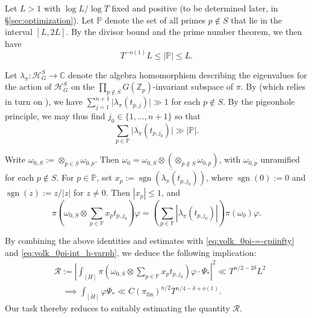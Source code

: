 \documentclass[reqno]{amsart}
\DeclareMathOperator{\sgn}{sgn}
\DeclareMathOperator{\fin}{fin}
\theoremstyle{plain} \newtheorem{theorem} {Theorem}
\theoremstyle{definition} \newtheorem{definition} [theorem] {Definition}
\theoremstyle{itplain} %
\numberwithin{equation}{section}
\numberwithin{theorem}{section}
\renewcommand{\leq}{\leqslant}
\begin{document}
Let $L > 1$ with $\log L / \log T$ fixed and positive (to be determined later, in \S\ref{sec:optimization}).  Let $\mathbb{P}$ denote the set of all primes $p \notin S$ that lie in the interval $[L,2 L]$.  By the divisor bound and the prime number theorem, we then have
\begin{equation*}
T^{-o(1)} L \leq |\mathbb{P}| \leq L.
\end{equation*}


Let $\lambda_\pi : \mathcal{H}_G^S \rightarrow \mathbb{C}$ denote the algebra homomorphism  describing the eigenvalues for the action of $\mathcal{H}_G^S$ on the $\prod_{p \notin S} G(\mathbb{Z}_p)$-invariant subspace of $\pi$.  By \cite[(5.6)]{2020arXiv201202187N} (which relies in turn on \cite[Cor 4.3]{2014arXiv1405.6691B}), we have $\sum_{j=1}^{n+1} \lvert \lambda_{\pi}(t_{p,j}) \rvert \gg 1$ for each $p \notin S$.  By the pigeonhole principle, we may thus find $j_0 \in \{1, \dotsc, n+1\}$ so that
\begin{equation*}
\sum_{p \in \mathbb{P}} \lvert \lambda_{\pi}(t_{p,j_0}) \rvert \gg |\mathbb{P}|.
\end{equation*}

Write $\omega_{0,S} := \otimes_{p \in S} \omega_{0,p}$.  Then $\omega_0 = \omega_{0,S} \otimes (\otimes_{p \notin S} \omega_{0,p})$, with $\omega_{0,p}$ unramified for each $p \notin S$.  For $p \in \mathbb{P}$, set $x_p := \overline{\sgn(\lambda_\pi(t_{p,j_0}))}$, where $\sgn(0) := 0$ and $\sgn(z) := z/|z|$ for $z \neq 0$.  Then $|x_p| \leq 1$, and
\begin{equation*}
  \pi \left( \omega_{0,S} \otimes \sum _{p \in \mathbb{P} } x_p t_{p,j_0} \right) \varphi
  =
  \left( \sum _{p \in \mathbb{P} } |\lambda_\pi(t_{p,j_0}) | \right)
\pi(\omega_0) \varphi.
\end{equation*}

By combining the above identities and estimates with
\eqref{eq:volk_0pi-=-cpiinfty} and
\eqref{eq:volk_0pi-int_h-varph}, we deduce the following implication:
\begin{align}
  &\mathcal{R} := \left\lvert
    \int _{[H]}
    \pi \left( \omega_{0,S} \otimes \sum _{p \in \mathbb{P} } x_p t_{p,j_0} \right) \varphi
    \cdot \Psi_{\ast}
  \right\rvert^2
  \ll
  T^{n/2 - 2 \delta } L^2 \label{eq:leftlvert-int-_h}
  \\
  &\quad \implies
    \int _{[H]} \varphi \Psi_{\ast} \ll
    C(\pi_{\fin})^{n/2}
    T^{n/4 - \delta + o(1)}. \nonumber
\end{align}
Our task thereby reduces to suitably estimating the quantity $\mathcal{R}$.
\end{document}
